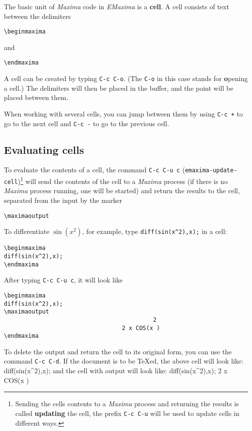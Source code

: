 \documentclass{article}
\newcommand{\emx}{\textsl{\sffamily EMaxima}}
\newcommand{\mx}{\textsl{\sffamily Maxima}}
\begin{document}
The basic unit of \mx{} code in \emx{} is a \textbf{cell}.  A cell
consists of text between the delimiters
\begin{verbatim}
\beginmaxima
\end{verbatim}
\noindent
and
\begin{verbatim}
\endmaxima
\end{verbatim}
\noindent
A cell can be created by typing \texttt{C-c C-o}.  (The \texttt{C-o} in this
case stands for \textbf{o}pening a cell.)  The delimiters will then be
placed in the buffer, and the point will be placed between them.

When working with several cells, you can jump between them by using
\texttt{C-c +} to go to the next cell and \texttt{C-c -} to go to the
previous cell.

\subsection{Evaluating cells}

\noindent
To evaluate the contents of a cell, the command
\texttt{C-c C-u c} (\texttt{emaxima-update-cell})\footnote{Sending the
  cells contents to a \mx{} process and returning the results is
  called \textbf{updating} the cell, the prefix 
\texttt{C-c C-u} will be used to update cells in different ways.} 
will send the contents
of the cell to a \mx{} process (if there is no \mx{} process running,
one will be started) and return the results to the cell,
separated from the input by the marker
\begin{verbatim}
\maximaoutput
\end{verbatim}
\noindent
To differentiate
$\sin(x^2)$, for example, type 
\texttt{diff(sin(x\^{}2),x);} in a cell:
\begin{verbatim}
\beginmaxima
diff(sin(x^2),x);
\endmaxima
\end{verbatim}
\noindent
After typing \texttt{C-c C-u c}, it will look like
\begin{verbatim}
\beginmaxima
diff(sin(x^2),x);
\maximaoutput
                                           2
                                  2 x COS(x )
\endmaxima
\end{verbatim}
\noindent
To delete the output and return the cell to its original form, you can
use the command \texttt{C-c C-d}.
If the document is to be \TeX{}ed, the above cell will look like:
\beginmaxima
diff(sin(x^2),x);
\endmaxima
and the cell with output will look like:
\beginmaxima
diff(sin(x^2),x);
                                  2 x COS(x )
\endmaxima
\end{document}
